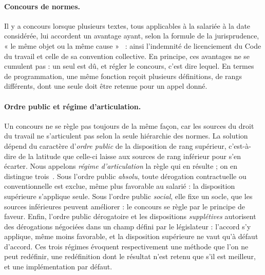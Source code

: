\paragraph{Concours de normes.} Il y a concours lorsque plusieurs textes, tous
  applicables à la salariée à la date considérée, lui accordent un avantage
  ayant, selon la formule de la jurisprudence, « le même objet ou la même
  cause »~\cite{cassap1988} : ainsi l'indemnité de licenciement du Code du
  travail et celle de sa convention collective. En principe, ces avantages ne
  se cumulent pas : un seul est dû, et régler le concours, c'est dire lequel.
  En termes de programmation, une même fonction reçoit plusieurs définitions,
  de rangs différents, dont une seule doit être retenue pour un appel donné.
\paragraph{Ordre public et régime d'articulation.} Un concours ne se règle pas
  toujours de la même façon, car les sources du droit du travail ne
  s'articulent pas selon la seule hiérarchie des normes. La solution dépend du
  caractère d'\emph{ordre public} de la disposition de rang supérieur,
  c'est-à-dire de la latitude que celle-ci laisse aux sources de rang inférieur
  pour s'en écarter. Nous appelons \emph{régime d'articulation} la règle qui en
  résulte ; on en distingue trois~\cite{viepublique2021}. Sous l'ordre public
  \emph{absolu}, toute dérogation contractuelle ou conventionnelle est exclue,
  même plus favorable au salarié : la disposition supérieure s'applique seule.
  Sous l'ordre public \emph{social}, elle fixe un socle, que les sources
  inférieures peuvent améliorer : le concours se règle par le principe de
  faveur. Enfin, l'ordre public dérogatoire et les dispositions
  \emph{supplétives} autorisent des dérogations négociées dans un champ défini
  par le législateur : l'accord s'y applique, même moins favorable, et la
  disposition supérieure ne vaut qu'à défaut d'accord. Ces trois régimes
  évoquent respectivement une méthode que l'on ne peut redéfinir, une
  redéfinition dont le résultat n'est retenu que s'il est meilleur, et une
  implémentation par défaut.
  
